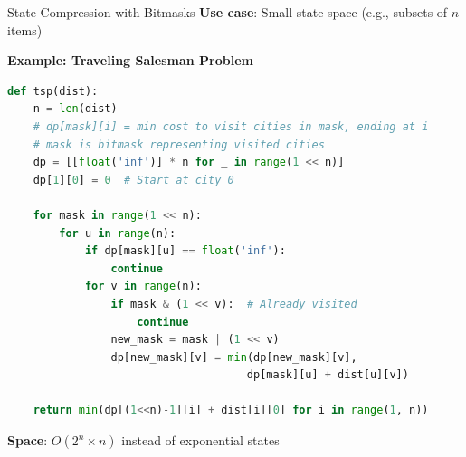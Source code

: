 \documentclass[aspectratio=169]{beamer}
\begin{document}
\begin{frame}[fragile]{State Compression with Bitmasks}
  \textbf{Use case}: Small state space (e.g., subsets of $n$ items)

  \vspace{0.3cm}

  \textbf{Example: Traveling Salesman Problem}
\begin{lstlisting}[language=Python, basicstyle=\ttfamily\tiny]
def tsp(dist):
    n = len(dist)
    # dp[mask][i] = min cost to visit cities in mask, ending at i
    # mask is bitmask representing visited cities
    dp = [[float('inf')] * n for _ in range(1 << n)]
    dp[1][0] = 0  # Start at city 0

    for mask in range(1 << n):
        for u in range(n):
            if dp[mask][u] == float('inf'):
                continue
            for v in range(n):
                if mask & (1 << v):  # Already visited
                    continue
                new_mask = mask | (1 << v)
                dp[new_mask][v] = min(dp[new_mask][v],
                                     dp[mask][u] + dist[u][v])

    return min(dp[(1<<n)-1][i] + dist[i][0] for i in range(1, n))
\end{lstlisting}

  \textbf{Space}: $O(2^n \times n)$ instead of exponential states
\end{frame}
\end{document}
